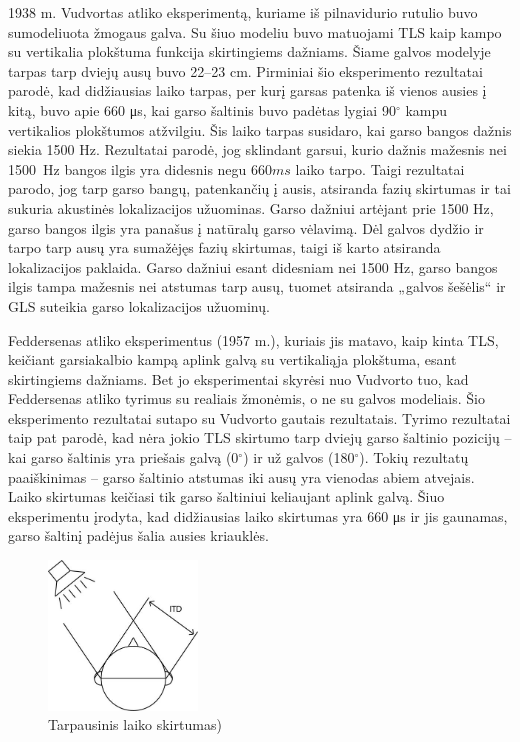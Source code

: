 \documentclass[]{vgtuef}
\begin{document}
1938 m. Vudvortas atliko eksperimentą, kuriame iš pilnavidurio rutulio buvo sumodeliuota žmogaus galva. Su šiuo modeliu buvo matuojami TLS kaip kampo su vertikalia plokštuma funkcija skirtingiems dažniams. Šiame galvos modelyje tarpas tarp dviejų ausų buvo 22--23 cm. Pirminiai šio eksperimento rezultatai parodė, kad didžiausias laiko tarpas, per kurį garsas patenka iš vienos ausies į kitą, buvo apie 660 μs, kai garso šaltinis buvo padėtas lygiai 90$^\circ$ kampu vertikalios plokštumos atžvilgiu. Šis laiko tarpas susidaro, kai garso bangos dažnis siekia 1500 Hz. Rezultatai parodė, jog sklindant garsui, kurio dažnis mažesnis nei 1500~Hz bangos ilgis yra didesnis negu $660 ms$ laiko tarpo. Taigi rezultatai parodo, jog tarp garso bangų, patenkančių į ausis, atsiranda fazių skirtumas ir tai sukuria akustinės lokalizacijos užuominas. Garso dažniui artėjant prie 1500 Hz, garso bangos ilgis yra panašus į natūralų garso vėlavimą. Dėl galvos dydžio ir tarpo tarp ausų yra sumažėjęs fazių skirtumas, taigi iš karto atsiranda lokalizacijos paklaida. Garso dažniui esant didesniam nei 1500 Hz, garso bangos ilgis tampa mažesnis nei atstumas tarp ausų, tuomet atsiranda „galvos šešėlis“   ir GLS suteikia garso lokalizacijos užuominų.

Feddersenas atliko eksperimentus (1957 m.), kuriais jis matavo, kaip kinta TLS, keičiant garsiakalbio kampą aplink galvą su vertikaliąja plokštuma, esant skirtingiems dažniams. Bet jo eksperimentai skyrėsi nuo Vudvorto tuo, kad Feddersenas atliko tyrimus su realiais žmonėmis, o ne su galvos modeliais. Šio eksperimento rezultatai sutapo su Vudvorto gautais rezultatais. Tyrimo rezultatai taip pat parodė, kad nėra jokio TLS skirtumo tarp dviejų garso šaltinio pozicijų – kai garso šaltinis yra priešais galvą (0$^\circ$) ir už galvos (180$^\circ$). Tokių rezultatų paaiškinimas – garso šaltinio atstumas iki ausų yra vienodas abiem atvejais. Laiko skirtumas keičiasi tik garso šaltiniui keliaujant aplink galvą. Šiuo eksperimentu įrodyta, kad didžiausias laiko skirtumas yra 660 μs ir jis gaunamas, garso šaltinį padėjus šalia ausies kriauklės. 

\begin{figure}[!h]
  \centering
  \includegraphics[width=150px]{img/ITD.jpg}
  \caption{Tarpausinis laiko skirtumas)}
  \label{fig:ITD_1}
\end{figure}
\end{document}
